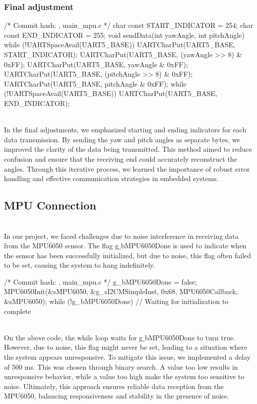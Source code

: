 \documentclass[12pt, a4paper]{article}
\begin{document}
\subsubsection{Final adjustment}\text{}
\begin{code}
/* Commit hash: , main_mpu.c */
char const START_INDICATOR = 254;
char const END_INDICATOR = 255;
void sendData(int yawAngle, int pitchAngle) {
    while (!UARTSpaceAvail(UART5_BASE)) {}
    UARTCharPut(UART5_BASE, START_INDICATOR);
    UARTCharPut(UART5_BASE, (yawAngle >> 8) & 0xFF);
    UARTCharPut(UART5_BASE, yawAngle & 0xFF);
    UARTCharPut(UART5_BASE, (pitchAngle >> 8) & 0xFF);
    UARTCharPut(UART5_BASE, pitchAngle & 0xFF);
    while (!UARTSpaceAvail(UART5_BASE)) {
        UARTCharPut(UART5_BASE, END_INDICATOR);
    }
}
\end{code}\text{}\\
In the final adjustments, we emphasized starting and ending indicators for each data transmission. 
By sending the yaw and pitch angles as separate bytes, we improved the clarity of the data being transmitted. 
This method aimed to reduce confusion and ensure that the receiving end could accurately reconstruct the angles. 
Through this iterative process, we learned the importance of robust error handling and effective communication strategies in embedded systems.

\subsection{MPU Connection}
\text{}\\
In our project, we faced challenges due to noise interference in receiving data from the MPU6050 sensor. 
The flag g$\_$bMPU6050Done is used to indicate when the sensor has been successfully initialized, 
but due to noise, this flag often failed to be set, causing the system to hang indefinitely. 
\begin{code}
/* Commit hash: , main_mpu.c */
g_bMPU6050Done = false;
MPU6050Init(&sMPU6050, &g_sI2CMSimpleInst, 0x68, MPU6050Callback, &sMPU6050);
while (!g_bMPU6050Done) {
    // Waiting for initialization to complete
}
\end{code}\text{}\\
On the above code, the while loop waits for g$\_$bMPU6050Done to turn true. 
However, due to noise, this flag might never be set, leading to a situation where the system appears unresponsive. 
To mitigate this issue, we implemented a delay of 500 ms. This was chosen through binary search. 
A value too low results in unresponsive behavior, while a value too high make the system too sensitive to noise. 
Ultimately, this approach ensures reliable data reception from the MPU6050, balancing responsiveness and stability in the presence of noise.
\end{document}
